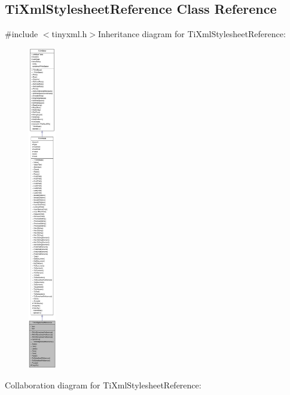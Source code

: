 \hypertarget{class_ti_xml_stylesheet_reference}{
\subsection{TiXmlStylesheetReference Class Reference}
\label{class_ti_xml_stylesheet_reference}
}


{\ttfamily \#include $<$tinyxml.h$>$}Inheritance diagram for TiXmlStylesheetReference:\nopagebreak
\begin{figure}[H]
\begin{center}
\leavevmode
\includegraphics[height=400pt]{class_ti_xml_stylesheet_reference__inherit__graph}
\end{center}
\end{figure}
Collaboration diagram for TiXmlStylesheetReference:\nopagebreak
